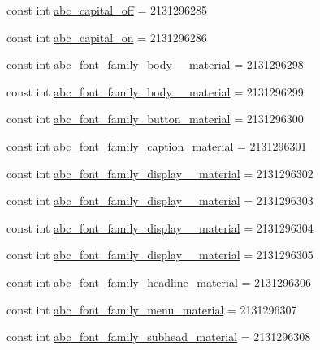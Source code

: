 \begin{CompactItemize}
\item 
const int \hyperlink{class__2doo_1_1_droid_1_1_resource_1_1_string_73d0afe7b5e86eab9db2d7ca125e65d3}{abc\_\-capital\_\-off} = 2131296285
\item 
const int \hyperlink{class__2doo_1_1_droid_1_1_resource_1_1_string_098baee6f942c42ef7ea09e740b8a5b9}{abc\_\-capital\_\-on} = 2131296286
\item 
const int \hyperlink{class__2doo_1_1_droid_1_1_resource_1_1_string_766290382c706969dd84bfc5384d3d37}{abc\_\-font\_\-family\_\-body\_\_\-material} = 2131296298
\item 
const int \hyperlink{class__2doo_1_1_droid_1_1_resource_1_1_string_7a8b7e6563b95289d13c6d232bac7e2e}{abc\_\-font\_\-family\_\-body\_\_\-material} = 2131296299
\item 
const int \hyperlink{class__2doo_1_1_droid_1_1_resource_1_1_string_ddb9e237bd864fdc054d23c6cbe15a0f}{abc\_\-font\_\-family\_\-button\_\-material} = 2131296300
\item 
const int \hyperlink{class__2doo_1_1_droid_1_1_resource_1_1_string_a77b3bea50559f948eb59a1d78e2c065}{abc\_\-font\_\-family\_\-caption\_\-material} = 2131296301
\item 
const int \hyperlink{class__2doo_1_1_droid_1_1_resource_1_1_string_7c1324563fed1edc831f2321a77809ad}{abc\_\-font\_\-family\_\-display\_\_\-material} = 2131296302
\item 
const int \hyperlink{class__2doo_1_1_droid_1_1_resource_1_1_string_07fc2b5be688b09e23b6f4b9ec9d53e1}{abc\_\-font\_\-family\_\-display\_\_\-material} = 2131296303
\item 
const int \hyperlink{class__2doo_1_1_droid_1_1_resource_1_1_string_e9a159c35897a44dee6717685f900119}{abc\_\-font\_\-family\_\-display\_\_\-material} = 2131296304
\item 
const int \hyperlink{class__2doo_1_1_droid_1_1_resource_1_1_string_740da4d05ac8b3432703238a7e70ea18}{abc\_\-font\_\-family\_\-display\_\_\-material} = 2131296305
\item 
const int \hyperlink{class__2doo_1_1_droid_1_1_resource_1_1_string_d15e02405135258415f1d938f2155a82}{abc\_\-font\_\-family\_\-headline\_\-material} = 2131296306
\item 
const int \hyperlink{class__2doo_1_1_droid_1_1_resource_1_1_string_ed6aa6b16dba18fa24caac724005e298}{abc\_\-font\_\-family\_\-menu\_\-material} = 2131296307
\item 
const int \hyperlink{class__2doo_1_1_droid_1_1_resource_1_1_string_7ef238e99966380b36552be84bda0c9b}{abc\_\-font\_\-family\_\-subhead\_\-material} = 2131296308

\end{CompactItemize}
